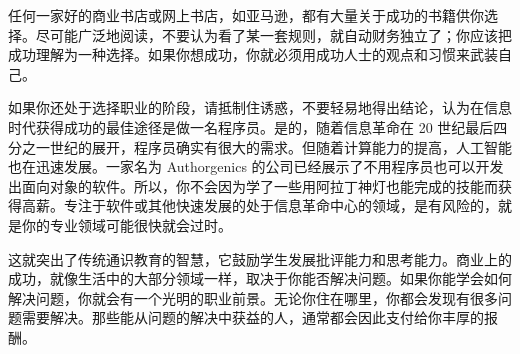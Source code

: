 任何一家好的商业书店或网上书店，如亚马逊，都有大量关于成功的书籍供你选择。尽可能广泛地阅读，不要认为看了某一套规则，就自动财务独立了；你应该把成功理解为一种选择。如果你想成功，你就必须用成功人士的观点和习惯来武装自己。

如果你还处于选择职业的阶段，请抵制住诱惑，不要轻易地得出结论，认为在信息时代获得成功的最佳途径是做一名程序员。是的，随着信息革命在 20 世纪最后四分之一世纪的展开，程序员确实有很大的需求。但随着计算能力的提高，人工智能也在迅速发展。一家名为 Authorgenics 的公司已经展示了不用程序员也可以开发出面向对象的软件。所以，你不会因为学了一些用阿拉丁神灯也能完成的技能而获得高薪。专注于软件或其他快速发展的处于信息革命中心的领域，是有风险的，就是你的专业领域可能很快就会过时。

这就突出了传统通识教育的智慧，它鼓励学生发展批评能力和思考能力。商业上的成功，就像生活中的大部分领域一样，取决于你能否解决问题。如果你能学会如何解决问题，你就会有一个光明的职业前景。无论你住在哪里，你都会发现有很多问题需要解决。那些能从问题的解决中获益的人，通常都会因此支付给你丰厚的报酬。

\let\cleardoublepage\clearpage